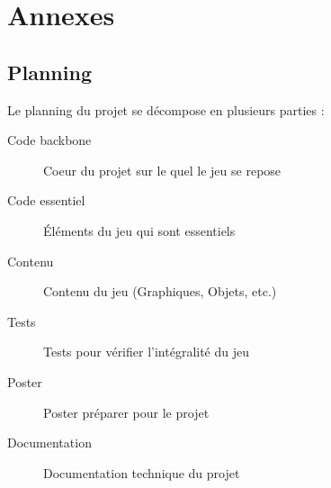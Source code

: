 \documentclass[11pt, a4paper, oneside]{report}
\begin{document}
\newpage
\chapter{Annexes}
\section{Planning}
Le planning du projet se décompose en plusieurs parties :\\
\begin{description}
	\item[Code backbone] Coeur du projet sur le quel le jeu se repose
	\item[Code essentiel] Éléments du jeu qui sont essentiels
	\item[Contenu] Contenu du jeu (Graphiques, Objets, etc.)
	\item[Tests] Tests pour vérifier l'intégralité du jeu
	\item[Poster] Poster préparer pour le projet
	\item[Documentation] Documentation technique du projet
\end{description}
\end{document}
